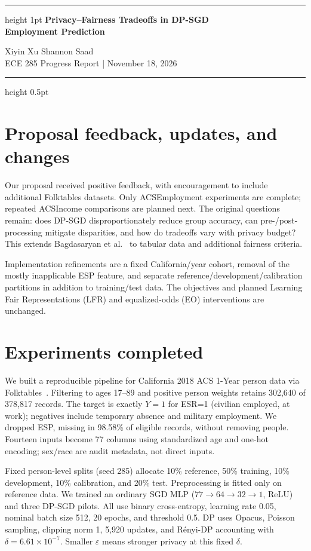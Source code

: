 \documentclass[11pt,letterpaper]{article}
\newcommand{\eps}{\varepsilon}
\begin{document}
\begin{center}
\hrule height 1pt\vspace{5pt}
{\large\bfseries Privacy--Fairness Tradeoffs in DP-SGD\\Employment Prediction}\par
\vspace{4pt}
Xiyin Xu \qquad Shannon Saad\\
ECE 285 Progress Report \quad | \quad November 18, 2026
\vspace{5pt}\hrule height 0.5pt
\end{center}
\vspace{-3pt}

\section{Proposal feedback, updates, and changes}
Our proposal received positive feedback, with encouragement to include additional Folktables datasets. Only ACSEmployment experiments are complete; repeated ACSIncome comparisons are planned next. The original questions remain: does DP-SGD disproportionately reduce group accuracy, can pre-/post-processing mitigate disparities, and how do tradeoffs vary with privacy budget? This extends Bagdasaryan et al.~\cite{bagdasaryan2019} to tabular data and additional fairness criteria.

Implementation refinements are a fixed California/year cohort, removal of the mostly inapplicable ESP feature, and separate reference/development/calibration partitions in addition to training/test data. The objectives and planned Learning Fair Representations (LFR) and equalized-odds (EO) interventions are unchanged.

\section{Experiments completed}
We built a reproducible pipeline for California 2018 ACS 1-Year person data via Folktables~\cite{ding2021}. Filtering to ages 17--89 and positive person weights retains 302,640 of 378,817 records. The target is exactly $Y=1$ for ESR=1 (civilian employed, at work); negatives include temporary absence and military employment. We dropped ESP, missing in 98.58\% of eligible records, without removing people. Fourteen inputs become 77 columns using standardized age and one-hot encoding; sex/race are audit metadata, not direct inputs.

Fixed person-level splits (seed 285) allocate 10\% reference, 50\% training, 10\% development, 10\% calibration, and 20\% test. Preprocessing is fitted only on reference data. We trained an ordinary SGD MLP ($77\!\rightarrow\!64\!\rightarrow\!32\!\rightarrow\!1$, ReLU) and three DP-SGD pilots. All use binary cross-entropy, learning rate 0.05, nominal batch size 512, 20 epochs, and threshold 0.5. DP uses Opacus, Poisson sampling, clipping norm 1, 5,920 updates, and R\'enyi-DP accounting with $\delta=6.61\times10^{-7}$. Smaller $\eps$ means stronger privacy at this fixed $\delta$.
\end{document}
